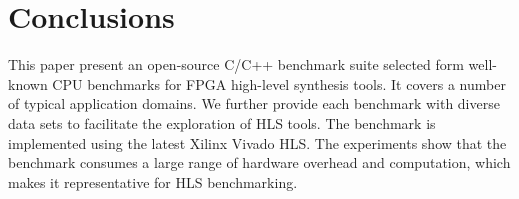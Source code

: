\documentclass[conference]{IEEEtran}
\begin{document}
\section{Conclusions}\label{section_conclusions}
This paper present an open-source C/C++ benchmark suite selected form well-known CPU benchmarks for FPGA high-level synthesis tools. It covers a number of typical application domains. We further provide each benchmark with diverse data sets to facilitate the exploration of HLS tools. The benchmark is implemented using the latest Xilinx Vivado HLS. The experiments show that the benchmark consumes a large range of hardware overhead and computation, which makes it representative for HLS benchmarking. 


%
%

\end{document}
